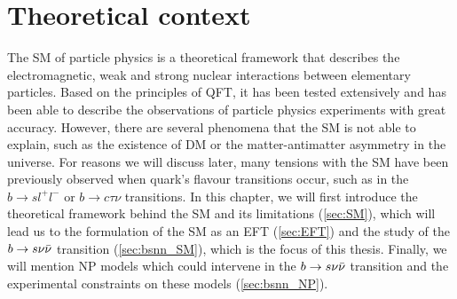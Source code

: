 \chapter{Theoretical context} \label{ch:theory}


The \gls{SM} of particle physics is a theoretical framework that describes the electromagnetic, weak and strong nuclear interactions between elementary particles. 
Based on the principles of \gls{QFT}, it has been tested extensively and has been able to describe the observations of particle physics experiments with great accuracy. 
However, there are several phenomena that the \gls{SM} is not able to explain, such as the existence of \gls{DM} or the matter-antimatter asymmetry in the universe. 
For reasons we will discuss later, many tensions with the \gls{SM} have been previously observed when quark's flavour transitions occur, such as in the $b \to s l^+ l^-$ or $b \to c \tau \nu$ transitions.
In this chapter, we will first introduce the theoretical framework behind the \gls{SM} and its limitations (\ref{sec:SM}), which will lead us to the formulation of the \gls{SM} as an \gls{EFT} (\ref{sec:EFT}) and the study of the $b \to s \nu \Bar{\nu}$ transition (\ref{sec:bsnn_SM}), which is the focus of this thesis.
Finally, we will mention \gls{NP} models which could intervene in the $b \to s \nu \Bar{\nu}$ transition and the experimental constraints on these models (\ref{sec:bsnn_NP}).







\cite{kolmogorov}